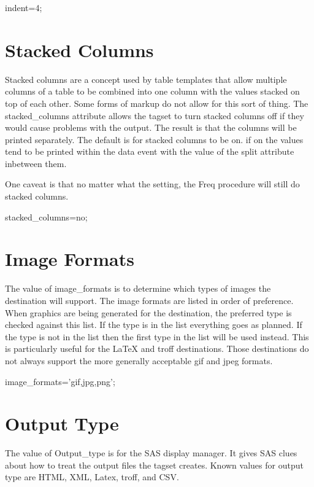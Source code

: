 \begin{sfvcode}
   indent=4;
\end{sfvcode}

\section{Stacked Columns}
Stacked columns are a concept used by table templates that allow multiple columns
of a table to be combined into one column with the values stacked on top
of each other.  Some forms of markup do not allow for this sort of thing.
The stacked\_columns attribute allows the tagset to turn stacked columns off
if they would cause problems with the output.  The result is that the columns
will be printed separately.  The default is for  stacked columns to be on.
if on the values tend to be printed within the data event with the value of
the split attribute inbetween them.

One caveat is that no matter what the setting, the Freq procedure will still
do stacked columns.

\begin{sfvcode}
   stacked_columns=no;
\end{sfvcode}

\section{Image Formats}
The value of image\_formats is to determine which types of images the destination
will support.  The image formats are listed in order of preference.  When graphics
are being generated for the destination, the preferred type is checked against
this list.  If the type is in the list everything goes as planned.  If the type
is not in the list then the first type in the list will be used instead.  This
is particularly useful for the LaTeX and troff destinations.  Those destinations
 do not always support the more generally acceptable gif and jpeg formats.

\begin{sfvcode}
   image_formats='gif,jpg,png';
\end{sfvcode}

\section{Output Type}
The value of Output\_type is for the SAS display manager.  It gives SAS clues
about how to treat the output files the tagset creates.  Known values for
output type are HTML, XML, Latex, troff, and CSV.

